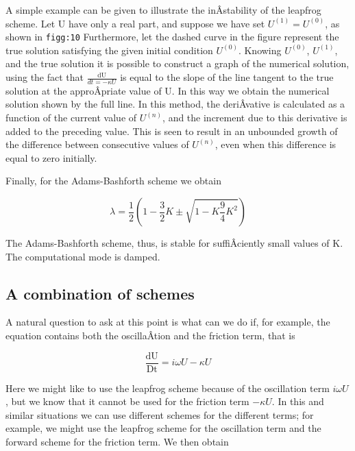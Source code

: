 A simple example can be given to illustrate the inÂ­stability of the
leapfrog scheme. Let U have only a real part, and suppose we have set
\(U^{( 1 )} = U^{( 0 )}\), as shown in \texttt{figg:10} Furthermore, let
the dashed curve in the figure represent the true solution satisfying
the given initial condition \(U^{\left( 0 \right)}\). Knowing
\(U^{\left( 0 \right)}\), \(U^{\left( 1 \right)}\), and the true
solution it is possible to construct a graph of the numerical solution,
using the fact that \(\frac{\text{dU}}{dt = - \kappa U}\) is equal to
the slope of the line tangent to the true solution at the approÂ­priate
value of U. In this way we obtain the numerical solution shown by the
full line. In this method, the deriÂ­vative is calculated as a function
of the current value of \(U^{\left( n \right)}\), and the increment due
to this derivative is added to the preceding value. This is seen to
result in an unbounded growth of the difference between consecutive
values of \(U^{\left( n \right)}\), even when this difference is equal
to zero initially.

\begin{figure}
\centering
{}
\caption{}
\end{figure}

Finally, for the Adams-Bashforth scheme we obtain

{\[\lambda = \frac{1}{2}\left( 1 - \frac{3}{2}K \pm \sqrt{1 - K\frac{9}{4}K^{2}} \right)\]}

The Adams-Bashforth scheme, thus, is stable for suffiÂ­ciently small
values of K. The computational mode is damped.

\subsection{\texorpdfstring{\textbf{A combination of
schemes}}{A combination of schemes}}\label{a-combination-of-schemes}

A natural question to ask at this point is what can we do if, for
example, the equation contains both the oscillaÂ­tion and the friction
term, that is

{\[\frac{\text{dU}}{\text{Dt}} = i\omega U - \kappa U\]}

Here we might like to use the leapfrog scheme because of the oscillation
term \(i\omega U\), but we know that it cannot be used for the friction
term \(- \kappa U\). In this and similar situations we can use different
schemes for the different terms; for example, we might use the leapfrog
scheme for the oscillation term and the forward scheme for the friction
term. We then obtain

